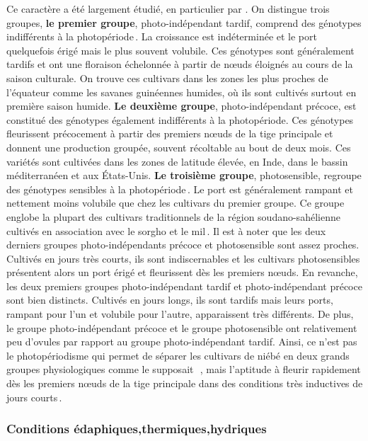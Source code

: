 \documentclass[a4paper,11pt]{article}
\begin{document}
Ce caractère a été largement étudié, en particulier
par\,\citeauthor{Steele_1972}\,\citeyear{Steele_1972}. On distingue
trois groupes, \textbf{le premier groupe}, photo-indépendant tardif,
comprend des génotypes indifférents à la
photopériode\,\cite{IITA_2008}. La croissance est indéterminée et le
port quelquefois érigé mais le plus souvent volubile. Ces génotypes
sont généralement tardifs et ont une floraison échelonnée à partir de
nœuds éloignés au cours de la saison culturale. On trouve ces
cultivars dans les zones les plus proches de l’équateur comme les
savanes guinéennes humides, où ils sont cultivés surtout en première
saison humide. \textbf{Le deuxième groupe}, photo-indépendant précoce,
est constitué des génotypes également indifférents à la
photopériode. Ces génotypes fleurissent précocement à partir des
premiers nœuds de la tige principale et donnent une production
groupée, souvent récoltable au bout de deux mois. Ces variétés sont
cultivées dans les zones de latitude élevée, en Inde, dans le bassin
méditerranéen et aux États-Unis. \textbf{Le troisième groupe},
photosensible, regroupe des génotypes sensibles à la
photopériode\,\cite{Steele_1972}. Le port est généralement rampant et
nettement moins volubile que chez les cultivars du premier groupe. Ce
groupe englobe la plupart des cultivars traditionnels de la région
soudano-sahélienne cultivés en association avec le sorgho et le
mil\,\cite{Doggett_1988}. Il est à noter que les deux derniers groupes
photo-indépendants précoce et photosensible sont assez
proches. Cultivés en jours très courts, ils sont indiscernables et les
cultivars photosensibles présentent alors un port érigé et fleurissent
dès les premiers nœuds. En revanche, les deux premiers groupes
photo-indépendant tardif et photo-indépendant précoce sont bien
distincts. Cultivés en jours longs, ils sont tardifs mais leurs ports,
rampant pour l’un et volubile pour l’autre, apparaissent très
différents. De plus, le groupe photo-indépendant précoce et le groupe
photosensible ont relativement peu d’ovules par rapport au groupe
photo-indépendant tardif. Ainsi, ce n’est pas le photopériodisme qui
permet de séparer les cultivars de niébé en deux grands groupes
physiologiques comme le supposait
\,\citeauthor{Steele_1972}\,\citeyear{Steele_1972}, mais l’aptitude à
fleurir rapidement dès les premiers nœuds de la tige principale dans
des conditions très inductives de jours
courts\,\cite{IITA_2008}.

\subsubsection{Conditions édaphiques,thermiques,hydriques}
\end{document}
